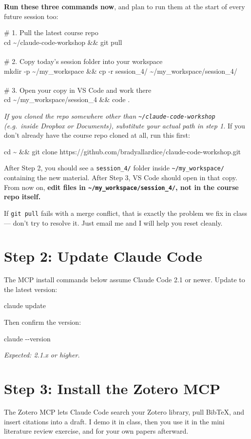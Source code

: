 \documentclass[11pt]{article}
\newcommand{\cmd}[1]{\par\vspace{0.2em}\colorbox{codegray}{\parbox{\dimexpr\linewidth-2\fboxsep}{\ttfamily\small #1}}\par\vspace{0.2em}}
\begin{document}
\textbf{Run these three commands now}, and plan to run them at the start of every future session too:

\cmd{\# 1. Pull the latest course repo\\cd \textasciitilde/claude-code-workshop \&\& git pull\\\\\# 2. Copy today's session folder into your workspace\\mkdir -p \textasciitilde/my\_workspace \&\& cp -r session\_4/ \textasciitilde/my\_workspace/session\_4/\\\\\# 3. Open your copy in VS Code and work there\\cd \textasciitilde/my\_workspace/session\_4 \&\& code .}

\textit{If you cloned the repo somewhere other than \texttt{\textasciitilde/claude-code-workshop} (e.g.\ inside Dropbox or Documents), substitute your actual path in step 1.} If you don't already have the course repo cloned at all, run this first:
\cmd{cd \textasciitilde{} \&\& git clone https://github.com/bradyallardice/claude-code-workshop.git}

After Step 2, you should see a \texttt{session\_4/} folder inside \texttt{\textasciitilde/my\_workspace/} containing the new material. After Step 3, VS Code should open in that copy. From now on, \textbf{edit files in \texttt{\textasciitilde/my\_workspace/session\_4/}, not in the course repo itself.}

If \texttt{git pull} fails with a merge conflict, that is exactly the problem we fix in class --- don't try to resolve it. Just email me and I will help you reset cleanly.

\section*{Step 2: Update Claude Code}

The MCP install commands below assume Claude Code 2.1 or newer. Update to the latest version:
\cmd{claude update}

Then confirm the version:
\cmd{claude -\/-version}

\textit{Expected: 2.1.x or higher.}

\section*{Step 3: Install the Zotero MCP}

The Zotero MCP lets Claude Code search your Zotero library, pull BibTeX, and insert citations into a draft. I demo it in class, then you use it in the mini literature review exercise, and for your own papers afterward.
\end{document}
